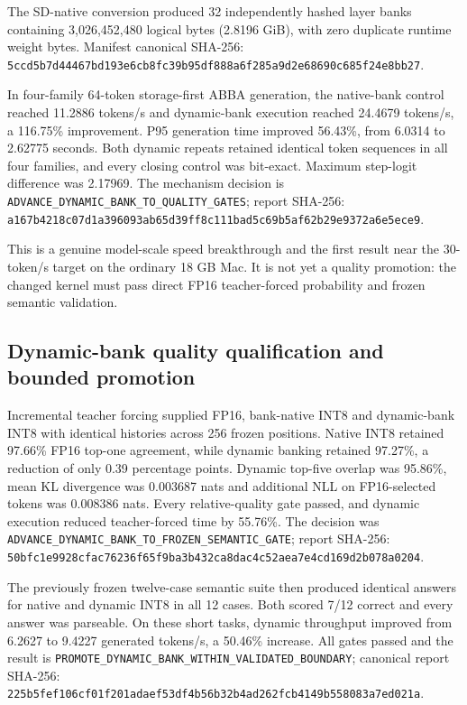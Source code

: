 The SD-native conversion produced 32 independently hashed layer banks containing
3,026,452,480 logical bytes (2.8196 GiB), with zero duplicate runtime weight
bytes. Manifest canonical SHA-256:
\texttt{5ccd5b7d44467bd193e6cb8fc39b95df888a6f285a9d2e68690c685f24e8bb27}.

In four-family 64-token storage-first ABBA generation, the native-bank control
reached 11.2886 tokens/s and dynamic-bank execution reached 24.4679 tokens/s,
a 116.75\% improvement. P95 generation time improved 56.43\%, from 6.0314 to
2.62775 seconds. Both dynamic repeats retained identical token sequences in all
four families, and every closing control was bit-exact. Maximum step-logit
difference was 2.17969. The mechanism decision is
\texttt{ADVANCE\_DYNAMIC\_BANK\_TO\_QUALITY\_GATES}; report SHA-256:
\texttt{a167b4218c07d1a396093ab65d39ff8c111bad5c69b5af62b29e9372a6e5ece9}.

This is a genuine model-scale speed breakthrough and the first result near the
30-token/s target on the ordinary 18 GB Mac. It is not yet a quality promotion:
the changed kernel must pass direct FP16 teacher-forced probability and frozen
semantic validation.

\subsection{Dynamic-bank quality qualification and bounded promotion}

Incremental teacher forcing supplied FP16, bank-native INT8 and dynamic-bank
INT8 with identical histories across 256 frozen positions. Native INT8 retained
97.66\% FP16 top-one agreement, while dynamic banking retained 97.27\%, a
reduction of only 0.39 percentage points. Dynamic top-five overlap was 95.86\%,
mean KL divergence was 0.003687 nats and additional NLL on FP16-selected tokens
was 0.008386 nats. Every relative-quality gate passed, and dynamic execution
reduced teacher-forced time by 55.76\%. The decision was
\texttt{ADVANCE\_DYNAMIC\_BANK\_TO\_FROZEN\_SEMANTIC\_GATE}; report SHA-256:
\texttt{50bfc1e9928cfac76236f65f9ba3b432ca8dac4c52aea7e4cd169d2b078a0204}.

The previously frozen twelve-case semantic suite then produced identical answers
for native and dynamic INT8 in all 12 cases. Both scored 7/12 correct and every
answer was parseable. On these short tasks, dynamic throughput improved from
6.2627 to 9.4227 generated tokens/s, a 50.46\% increase. All gates passed and the
result is \texttt{PROMOTE\_DYNAMIC\_BANK\_WITHIN\_VALIDATED\_BOUNDARY}; canonical
report SHA-256:
\texttt{225b5fef106cf01f201adaef53df4b56b32b4ad262fcb4149b558083a7ed021a}.


